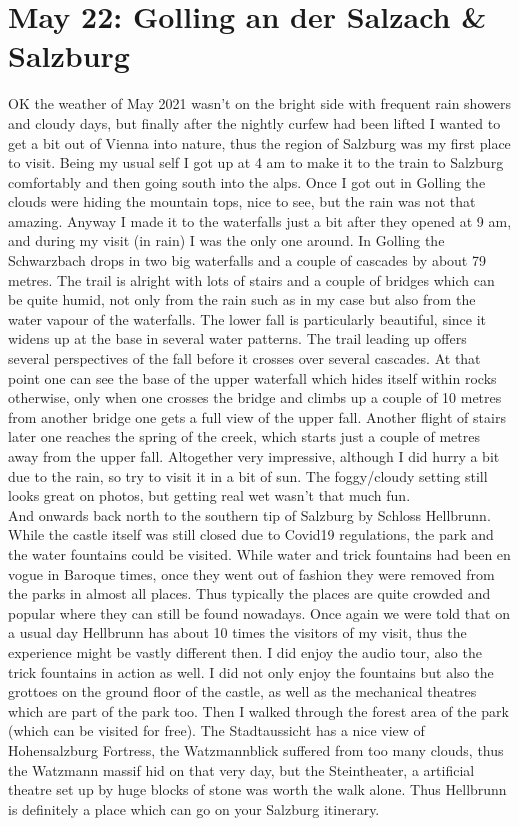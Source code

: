\section{May 22: Golling an der Salzach \& Salzburg}
\label{2021GollingSalzburg}

OK the weather of May 2021 wasn't on the bright side with frequent rain showers and cloudy days, but finally after the nightly curfew had been lifted I wanted to get a bit out of Vienna into nature, thus the region of Salzburg was my first place to visit. Being my usual self I got up at 4 am to make it to the train to Salzburg comfortably and then going south into the alps. Once I got out in Golling the clouds were hiding the mountain tops, nice to see, but the rain was not that amazing. Anyway I made it to the waterfalls just a bit after they opened at 9 am, and during my visit (in rain) I was the only one around. In Golling the Schwarzbach drops in two big waterfalls and a couple of cascades by about 79 metres. The trail is alright with lots of stairs and a couple of bridges which can be quite humid, not only from the rain such as in my case but also from the water vapour of the waterfalls. The lower fall is particularly beautiful, since it widens up at the base in several water patterns. The trail leading up offers several perspectives of the fall before it crosses over several cascades. At that point one can see the base of the upper waterfall which hides itself within rocks otherwise, only when one crosses the bridge and climbs up a couple of 10 metres from another bridge one gets a full view of the upper fall. Another flight of stairs later one reaches the spring of the creek, which starts just a couple of metres away from the upper fall. Altogether very impressive, although I did hurry a bit due to the rain, so try to visit it in a bit of sun. The foggy/cloudy setting still looks great on photos, but getting real wet wasn't that much fun.\\
And onwards back north to the southern tip of Salzburg by Schloss Hellbrunn. While the castle itself was still closed due to Covid19 regulations, the park and the water fountains could be visited. While water and trick fountains had been en vogue in Baroque times, once they went out of fashion they were removed from the parks in almost all places. Thus typically the places are quite crowded and popular where they can still be found nowadays. Once again we were told that on a usual day Hellbrunn has about 10 times the visitors of my visit, thus the experience might be vastly different then. I did enjoy the audio tour, also the trick fountains in action as well. I did not only enjoy the fountains but also the grottoes on the ground floor of the castle, as well as the mechanical theatres which are part of the park too. Then I walked through the forest area of the park (which can be visited for free). The Stadtaussicht has a nice view of Hohensalzburg Fortress, the Watzmannblick suffered from too many clouds, thus the Watzmann massif hid on that very day, but the Steintheater, a artificial theatre set up by huge blocks of stone was worth the walk alone. Thus Hellbrunn is definitely a place which can go on your Salzburg itinerary.\\
